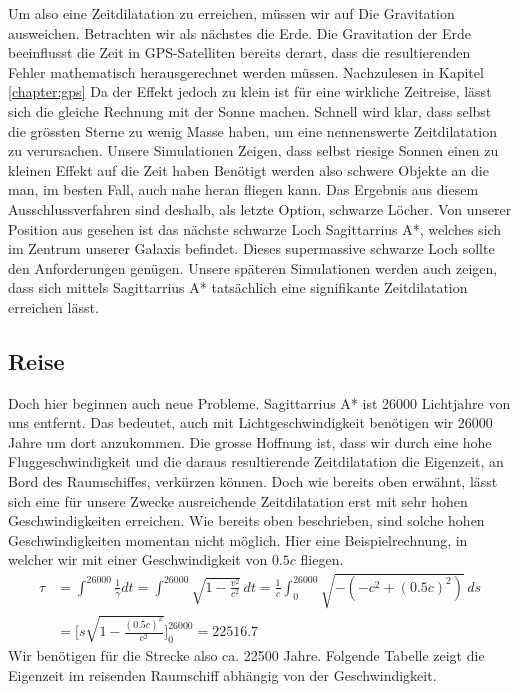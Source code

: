 \begin{refsection}
    Um also eine Zeitdilatation zu erreichen, müssen wir auf Die Gravitation ausweichen. Betrachten wir als nächstes die Erde. Die Gravitation der Erde beeinflusst die Zeit in GPS-Satelliten bereits derart, dass die resultierenden Fehler mathematisch herausgerechnet werden müssen. Nachzulesen in Kapitel \ref{chapter:gps} %
    Da der Effekt jedoch zu klein ist für eine wirkliche Zeitreise, lässt sich die gleiche Rechnung mit der Sonne machen. Schnell wird klar, dass selbst die grössten Sterne zu wenig Masse haben, um eine nennenswerte Zeitdilatation zu verursachen. Unsere Simulationen Zeigen, dass selbst riesige Sonnen einen zu kleinen Effekt auf die Zeit haben
    Benötigt werden also schwere Objekte an die man, im besten Fall, auch nahe heran fliegen kann. Das Ergebnis aus diesem Ausschlussverfahren sind deshalb, als letzte Option, schwarze Löcher. Von unserer Position aus gesehen ist das nächste schwarze Loch Sagittarrius A*, welches sich im Zentrum unserer Galaxis befindet. Dieses supermassive schwarze Loch sollte den Anforderungen genügen. Unsere späteren Simulationen werden auch zeigen, dass sich mittels Sagittarrius A* tatsächlich eine signifikante Zeitdilatation erreichen lässt.
    
    \subsection{Reise}
    
    Doch hier beginnen auch neue Probleme. Sagittarrius A* ist 26000 Lichtjahre von uns entfernt. Das bedeutet, auch mit Lichtgeschwindigkeit benötigen wir 26000 Jahre um dort anzukommen. Die grosse Hoffnung ist, dass wir durch eine hohe Fluggeschwindigkeit und die daraus resultierende Zeitdilatation die Eigenzeit, an Bord des Raumschiffes, verkürzen können. 
    Doch wie bereits oben erwähnt, lässt sich eine für unsere Zwecke ausreichende Zeitdilatation erst mit sehr hohen Geschwindigkeiten erreichen. Wie bereits oben beschrieben, sind solche hohen Geschwindigkeiten momentan nicht möglich.
    Hier eine Beispielrechnung, in welcher wir mit einer Geschwindigkeit von $0.5c$ fliegen.
	\begin{align*}
	\tau
	&= 
	\int_{}^{26000}\frac{1}{\gamma}dt=\int_{}^{26000}\sqrt{1-\frac{v^2}{c^2}}\,dt
	= 
	\frac{1}{c}\int_{0}^{26000}\sqrt{-(-c^2+(0.5c)^2)}\,ds\\
	&=
	\biggl[s\sqrt{1-\frac{(0.5c)^{2}}{c^2}}\biggr]_0^{26000}
	=
	22516.7
	\end{align*}
	Wir benötigen für die Strecke also ca. 22500 Jahre.
	Folgende Tabelle zeigt die Eigenzeit im reisenden Raumschiff abhängig von der Geschwindigkeit.
	

\end{refsection}
